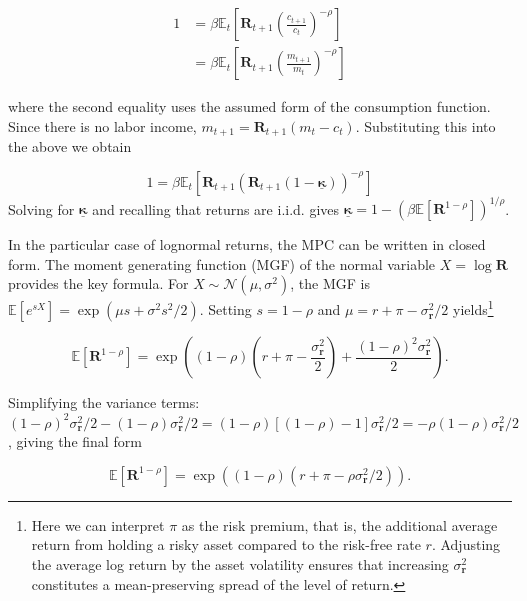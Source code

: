 \documentclass[preprint,authoryear]{elsarticle}
\newcommand{\Ex}{\mathbf{\mathbb{E}}}
\newcommand{\DiscFac}{\beta}
\newcommand{\CRRA}{\rho}
\newcommand{\MPC}{\boldsymbol{\kappa}}
\newcommand{\MPCmin}{\underline{\MPC}}
\newcommand{\mNrm}{m}
\newcommand{\cNrm}{c}
\newcommand{\Nrml}{\mathcal{N}}
\newcommand{\std}{\sigma}
\newcommand{\risky}{\mathbf{r}}
\newcommand{\Risky}{\mathbf{R}}
\newcommand{\equityPrem}{\pi}
\begin{document}
\begin{equation}
\label{eq:stochReturnsEulerEqn}
\begin{aligned}
1 &= \DiscFac \Ex_t\left[\Risky_{t+1} \left(\frac{\cNrm_{t+1}}{\cNrm_t}\right)^{-\CRRA}\right]\\
&= \DiscFac \Ex_t\left[\Risky_{t+1} \left(\frac{\mNrm_{t+1}}{\mNrm_t}\right)^{-\CRRA}\right]
\end{aligned}
\end{equation}

where the second equality uses the assumed form of the consumption function.  Since there is no labor income, $\mNrm_{t+1} = \Risky_{t+1}(\mNrm_t - \cNrm_t)$.  Substituting this into the above we obtain

\begin{equation}
\label{eq:stochReturnsEulerEqnContd}
1 = \DiscFac \Ex_t\left[\Risky_{t+1} \left(\Risky_{t+1}(1-\MPCmin)\right)^{-\CRRA}\right]
\end{equation}
Solving for $\MPCmin$ and recalling that returns are i.i.d. gives $\MPCmin=1 - (\DiscFac \Ex[\Risky^{1 -\CRRA}])^{1/\CRRA}$.

In the particular case of lognormal returns, the MPC can be written in closed form.  The moment generating function (MGF) of the normal variable $X = \log \Risky$ provides the key formula. For $X \sim \Nrml(\mu, \sigma^2)$, the MGF is $\Ex[e^{sX}] = \exp(\mu s + \sigma^2 s^2/2)$. Setting $s = 1 -\CRRA$ and $\mu = r + \equityPrem - \std_{\risky}^2/2$ yields\footnote{Here we can interpret $\equityPrem$ as the risk premium, that is, the additional average return from holding a risky asset compared to the risk-free rate $r$.  Adjusting the average log return by the asset volatility ensures that increasing $\std_{\risky}^2$ constitutes a mean-preserving spread of the level of return.}

\begin{equation}
\Ex[\Risky^{1-\CRRA}] = \exp\left((1-\CRRA)\left(r+\equityPrem - \frac{\std_{\risky}^2}{2}\right) + \frac{(1-\CRRA)^2\std_{\risky}^2}{2}\right).
\end{equation}

Simplifying the variance terms: $(1 -\CRRA)^2\std_{\risky}^2/2 - (1 -\CRRA)\std_{\risky}^2/2 = (1 -\CRRA)[(1 -\CRRA) -1]\std_{\risky}^2/2 = -\CRRA(1 -\CRRA)\std_{\risky}^2/2$, giving the final form

\begin{equation}
\Ex[\Risky^{1-\CRRA}] = \exp\left((1-\CRRA)\left(r+\equityPrem - \CRRA\std_{\risky}^2/2\right)\right).
\end{equation}



\end{document}
